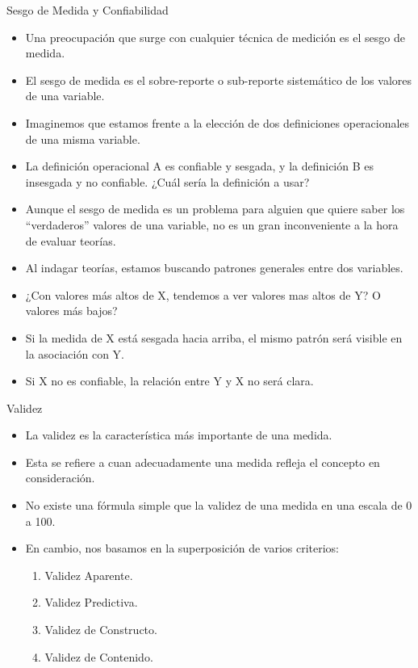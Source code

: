 \documentclass[xcolor=dvipsnames]{beamer}
\begin{document}
\begin{frame}{Sesgo de Medida y Confiabilidad}
\begin{itemize}
	\justifying
\item Una preocupación que surge con cualquier técnica de medición es el sesgo de medida.
\item El sesgo de medida es el sobre-reporte o sub-reporte sistemático de los valores de una variable.
 \item Imaginemos que estamos frente a la elección de dos definiciones operacionales de una misma variable. 
\item La definición operacional A es confiable y sesgada, y la definición B es insesgada y no confiable. ¿Cuál sería la definición a usar?
\end{itemize}
\end{frame}

\begin{frame}
	\begin{itemize}
		\justifying
 \item Aunque el sesgo de medida es un problema para alguien que quiere saber los ``verdaderos'' valores de una variable, no es un gran inconveniente a la hora de evaluar teorías.
 \item Al indagar teorías, estamos buscando patrones generales entre dos variables.
 \item ¿Con valores más altos de X, tendemos a ver valores mas altos de Y? O valores más bajos?
 \item Si la medida de X está sesgada hacia arriba, el mismo patrón será visible en la asociación con Y.
 \item Si X no es confiable, la relación entre Y y X no será clara. 
\end{itemize}
\end{frame}

\begin{frame}{Validez}
\begin{itemize}
\justifying
\item La validez es la característica más importante de una medida.
\item Esta se refiere a cuan adecuadamente una medida refleja el concepto en consideración.
\item No existe una fórmula  simple que la validez de una medida en una escala de 0 a 100. 
\item En cambio, nos basamos en la superposición de varios criterios:
\begin{enumerate}
\item Validez Aparente.
\item Validez Predictiva.
\item Validez de Constructo.
\item Validez de Contenido.
\end{enumerate}
\end{itemize}
\end{frame}
\end{document}
